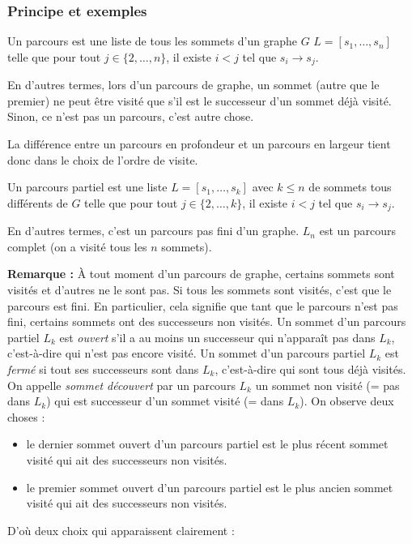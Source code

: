 \documentclass[../../../main.tex]{subfiles}
\begin{document}
\subsubsection{Principe et exemples}
 {
	Un parcours est une liste de tous les sommets d'un graphe $G$ $L = [s_1, \dots, s_n]$ telle que pour tout $j\in\{2, \dots, n\}$, il existe $i < j$ tel que $s_i\rightarrow s_j$.\newline

	En d'autres termes, lors d'un parcours de graphe, un sommet (autre que le premier) ne peut être visité que s'il est le successeur d'un sommet déjà visité. Sinon, ce n'est pas un parcours, c'est autre chose.	
}
La différence entre un parcours en profondeur et un parcours en largeur tient donc dans le choix de l'ordre de visite.
 {
	Un parcours partiel est une liste $L = [s_1, \dots, s_k]$ avec $k \leq n$ de sommets tous différents de $G$ telle que pour tout $j\in\{2, \dots, k\}$, il existe $i < j$ tel que $s_i\rightarrow s_j$.\newline

	En d'autres termes, c'est un parcours pas fini d'un graphe. $L_n$ est un parcours complet (on a visité tous les $n$ sommets).
}
\textbf{Remarque :} À tout moment d'un parcours de graphe, certains sommets sont visités et d'autres ne le sont pas. Si tous les sommets sont visités, c'est que le parcours est fini. En particulier, cela signifie que tant que le parcours n'est pas fini, certains sommets ont des successeurs non visités.
 {
	Un sommet d'un parcours partiel $L_k$ est \textit{ouvert} s'il a au moins un successeur qui n'apparaît pas dans $L_k$, c'est-à-dire qui n'est pas encore visité.
}
 {
	Un sommet d'un parcours partiel $L_k$ est \textit{fermé} si tout ses successeurs sont dans $L_k$, c'est-à-dire qui sont tous déjà visités.
}
 {
	On appelle \textit{sommet découvert} par un parcours $L_k$ un sommet non visité (= pas dans $L_k$) qui est successeur d'un sommet visité (= dans $L_k$).
}
On observe deux choses :
\begin{itemize}
	\item le dernier sommet ouvert d'un parcours partiel est le plus récent sommet visité qui ait des successeurs non visités.
	\item le premier sommet ouvert d'un parcours partiel est le plus ancien sommet visité qui ait des successeurs non visités.
\end{itemize}
D'où deux choix qui apparaissent clairement :
\end{document}
